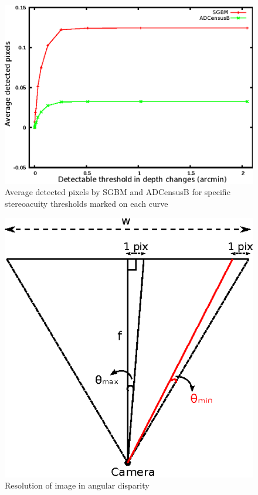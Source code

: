 \begin{figure}[H]
\centering
\includegraphics{algthreshBoth}
\caption{Average detected pixels by SGBM and ADCensusB for specific stereoacuity thresholds marked on each curve}
\label{fig:algthresh}
\end{figure} 
\begin{figure}[H]
\centering
\includegraphics{camRes}
\caption{Resolution of image in angular disparity}
\label{fig:camResolution}
\end{figure}


